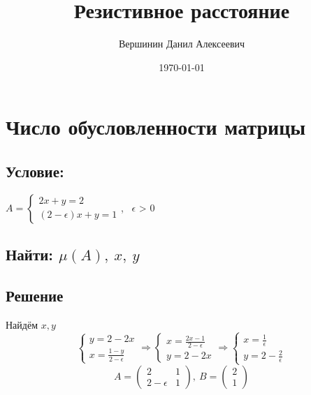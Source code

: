 \documentclass[12pt]{article}
\title{\vspace{-1cm}Резистивное расстояние}
\author{Вершинин Данил Алексеевич}
\date{\today}
\begin{document}
	
\section{Число обусловленности матрицы}
\subsection{Условие: }
$A = \begin{cases}
	2x+y=2 \\
	(2-\epsilon)x + y = 1
\end{cases}$, \ $\epsilon$ > 0

\subsection{Найти: $\mu(A), \ x, \ y$}
\subsection{Решение}
Найдём $x,y$\\
\[\begin{cases}
	y = 2 - 2x\\
	x = \frac{1-y}{2-\epsilon}
\end{cases} \Rightarrow 
\begin{cases}
	x = \frac{2x-1}{2-\epsilon}\\
	y = 2-2x
\end{cases} \Rightarrow
\begin{cases}
	x = \frac{1}{\epsilon}\\
	y = 2-\frac{2}{\epsilon}
\end{cases}\]
\[A = \begin{pmatrix}
	2 & 1\\
	2-\epsilon & 1
\end{pmatrix},  \ B = \begin{pmatrix}
2 \\ 1
\end{pmatrix}\]
\end{document}
